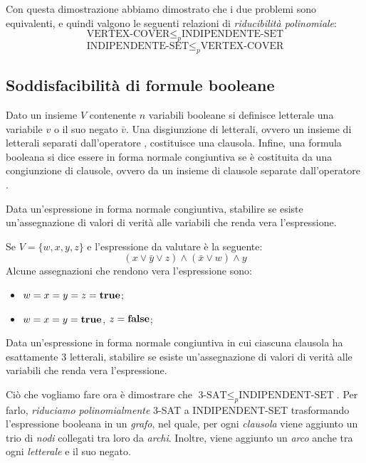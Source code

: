 \noindent
Con questa dimostrazione abbiamo dimostrato che i due problemi sono equivalenti,
e quindi valgono le seguenti relazioni di \emph{riducibilità polinomiale}:
\[\text{VERTEX-COVER}\leq_p\text{INDIPENDENTE-SET}\]
\[\text{INDIPENDENTE-SET}\leq_p\text{VERTEX-COVER}\]

\subsection{Soddisfacibilità di formule booleane}
\begin{definition}
    Dato un insieme $V$ contenente $n$ variabili booleane si definisce letterale
    una variabile $v$ o il suo negato $\bar{v}$. Una disgiunzione di letterali,
    ovvero un insieme di letterali separati dall'operatore , costituisce
    una clausola. Infine, una formula booleana si dice essere in forma normale
    congiuntiva se è costituita da una congiunzione di clausole, ovvero da un
    insieme di clausole separate dall'operatore .
\end{definition}
\begin{problem}
    Data un'espressione in forma normale congiuntiva, stabilire se esiste
    un'assegnazione di valori di verità alle variabili che renda vera l'espressione.
\end{problem}
\begin{eg}[Esempio]
    Se $V=\{w,x,y,z\}$ e l'espressione da valutare è la seguente:
    \[(x\vee\bar{y}\vee z)\wedge(\bar{x}\vee w)\wedge y\]
    Alcune assegnazioni che rendono vera l'espressione sono:
    \begin{itemize}
        \item $w=x=y=z={\bf true}$;
        \item $w=x=y={\bf true}$, $z={\bf false}$;
    \end{itemize}
\end{eg}
\begin{problem}
    Data un'espressione in forma normale congiuntiva in cui ciascuna clausola ha
    esattamente 3 letterali, stabilire se esiste un'assegnazione di valori di
    verità alle variabili che renda vera l'espressione.
\end{problem}

\noindent
Ciò che vogliamo fare ora è dimostrare che $\text{3-SAT}\leq_p\text{INDIPENDENT-SET}$.
Per farlo, \emph{riduciamo polinomialmente} 3-SAT a INDIPENDENT-SET trasformando
l'espressione booleana in un \emph{grafo}, nel quale, per ogni \emph{clausola}
viene aggiunto un trio di \emph{nodi} collegati tra loro da \emph{archi}.
Inoltre, viene aggiunto un \emph{arco} anche tra ogni \emph{letterale} e il
suo negato.

